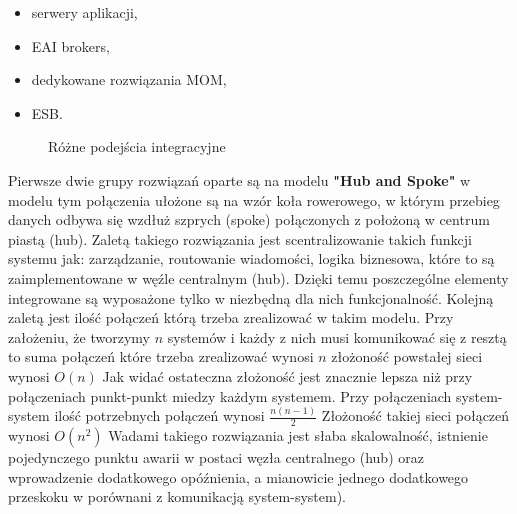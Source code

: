 \begin{itemize}
	\item serwery aplikacji,
	\item EAI brokers,
	\item dedykowane rozwiązania MOM,
	\item ESB.
\end{itemize}
\setlength\fboxsep{20pt}
\setlength\fboxrule{1pt}
\begin{figure}[!h]
	\centering
	\caption{Różne podejścia integracyjne  \cite{chappell2004}}\label{fig:podejscia_integracyjne}
\end{figure}

Pierwsze dwie grupy rozwiązań oparte są na modelu \textbf{"Hub and Spoke"}  w modelu tym połączenia ułożone są na wzór koła rowerowego, w którym przebieg danych odbywa się wzdłuż szprych (spoke) połączonych z położoną w centrum piastą (hub). Zaletą takiego rozwiązania jest scentralizowanie takich funkcji systemu jak: zarządzanie, routowanie wiadomości, logika biznesowa, które to są zaimplementowane w węźle centralnym (hub). Dzięki temu poszczególne elementy integrowane są wyposażone tylko w niezbędną dla nich funkcjonalność. Kolejną zaletą jest ilość połączeń którą trzeba zrealizować w takim modelu. Przy założeniu, że tworzymy \begin{math}n\end{math}  systemów i każdy z nich musi komunikować się z resztą to suma połączeń które trzeba zrealizować wynosi  \begin{math}n\end{math}  złożoność powstałej sieci wynosi  \begin{math}O(n)\end{math}  Jak widać ostateczna złożoność jest znacznie lepsza niż przy połączeniach punkt-punkt miedzy każdym systemem. Przy połączeniach system-system  ilość potrzebnych połączeń wynosi   \begin{math}\frac{n (n- 1)}{2}\end{math}  Złożoność takiej sieci połączeń wynosi  \begin{math}O(n^2)\end{math}  Wadami takiego rozwiązania jest słaba skalowalność, istnienie pojedynczego punktu awarii w postaci węzła centralnego (hub) oraz wprowadzenie dodatkowego opóźnienia, a mianowicie jednego dodatkowego przeskoku w porównani z komunikacją system-system).

